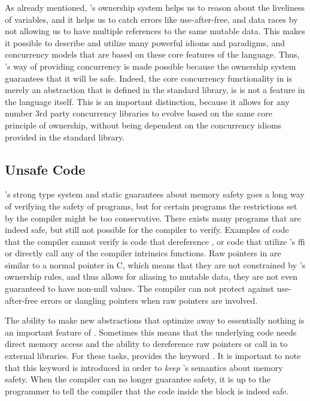 As already mentioned, {\rust}'s ownership system helps us to reason about the liveliness of variables, and it helps us to catch errors like use-after-free, and data races by not allowing us to have multiple references to the same mutable data.
This makes it possible to describe and utilize many powerful idioms and paradigms, and concurrency models that are based on these core features of the language.
Thus, {\rust}'s way of providing concurrency is made possible because the ownership system guarantees that it will be safe.
Indeed, the core concurrency functionality in {\rust} is merely an abstraction that is defined in the standard library, is is not a feature in the language itself.
This is an important distinction, because it allows for any number 3rd party concurrency libraries to evolve based on the same core principle of ownership, without being dependent on the concurrency idioms provided in the standard library.

\subsection{Unsafe Code} %
\label{ssub:unsafe_code}

\rust's strong type system and static guarantees about memory safety goes a long way of verifying the safety of programs, but for certain programs the restrictions set by the compiler might be too conservative.
There exists many programs that are indeed safe, but still not possible for the compiler to verify.
Examples of code that the compiler cannot verify is code that dereference , or code that utilize {\rust}'s \gls{ffi} or directly call any of the compiler intrinsics functions.
Raw pointers in {\rust} are similar to a normal pointer in C, which means that they are not constrained by {\rust}'s ownership rules, and thus allows for aliasing to mutable data, they are not even guaranteed to have non-null values.
The compiler can not protect against use-after-free errors or dangling pointers when raw pointers are involved.

The ability to make new abstractions that optimize away to essentially nothing is an important feature of {\rust}.
Sometimes this means that the underlying code needs direct memory access and the ability to dereference raw pointers or call in to external libraries.
For these tasks, {\rust} provides the keyword {\unsafe}.
It is important to note that this {\unsafe} keyword is introduced in order to \emph{keep} {\rust}'s semantics about memory safety.
When the compiler can no longer guarantee safety, it is up to the programmer to tell the compiler that the code inside the {\unsafe} block is indeed safe.


